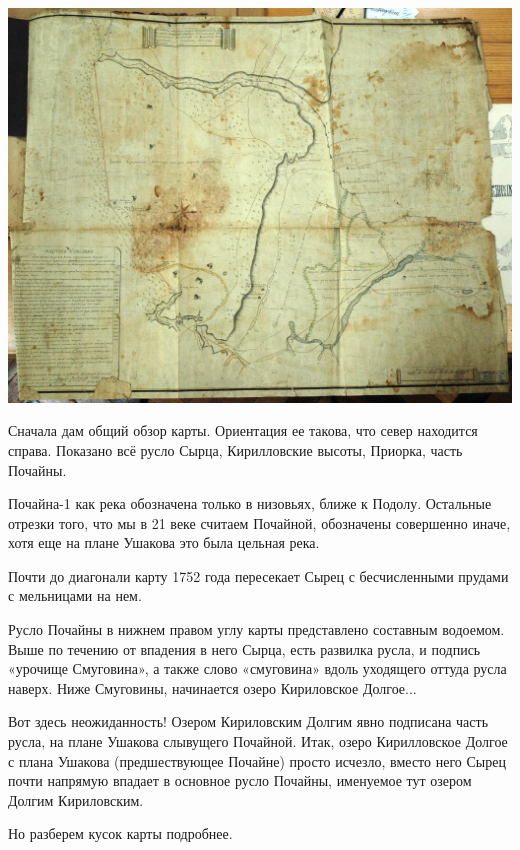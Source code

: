 \begin{center}
\includegraphics[width=\linewidth]{chast-colebanie-osnov/pochayna/map1752.jpg}
\end{center}

Сначала дам общий обзор карты. Ориентация ее такова, что север находится справа. Показано всё русло Сырца, Кирилловские высоты, Приорка, часть Почайны.

Почайна-1 как река обозначена только в низовьях, ближе к Подолу. Остальные отрезки того, что мы в 21 веке считаем Почайной, обозначены совершенно иначе, хотя еще на плане Ушакова это была цельная река.

Почти до диагонали карту 1752 года пересекает Сырец с бесчисленными прудами с мельницами на нем. 

Русло Почайны в нижнем правом углу карты представлено составным водоемом. Выше по течению от впадения в него Сырца, есть развилка русла, и подпись «урочище Смуговина», а также слово «смуговина» вдоль уходящего оттуда русла наверх. Ниже Смуговины, начинается озеро Кириловское Долгое...

Вот здесь неожиданность! Озером Кириловским Долгим явно подписана часть русла, на плане Ушакова слывущего Почайной. Итак, озеро Кирилловское Долгое с плана Ушакова (предшествующее Почайне) просто исчезло, вместо него Сырец почти напрямую впадает в основное русло Почайны, именуемое тут озером Долгим Кириловским.

Но разберем кусок карты подробнее.

